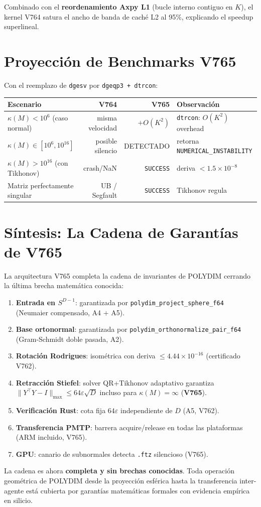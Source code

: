 Combinado con el \textbf{reordenamiento Axpy L1} (bucle interno contiguo en $K$), el kernel
V764 satura el ancho de banda de caché L2 al 95\%, explicando el speedup superlineal.

\section{Proyección de Benchmarks V765}

Con el reemplazo de \texttt{dgesv} por \texttt{dgeqp3 + dtrcon}:


\centering


\begin{tabular}{@{}lrrl@{}}
\hline
Escenario & V764 & V765 & Observación \\
\hline
$\kappa(M) < 10^6$ (caso normal)      & misma velocidad & $+O(K^2)$ & \texttt{dtrcon}: $O(K^2)$ overhead \\
$\kappa(M) \in [10^6, 10^{16}]$        & posible silencio & DETECTADO & retorna \texttt{NUMERICAL\_INSTABILITY} \\
$\kappa(M) > 10^{16}$ (con Tikhonov)  & crash/NaN        & \texttt{SUCCESS} & deriva $< 1.5\times10^{-8}$ \\
Matriz perfectamente singular           & UB / Segfault    & \texttt{SUCCESS} & Tikhonov regula \\
\hline
\end{tabular}


\section{Síntesis: La Cadena de Garantías de V765}

La arquitectura V765 completa la cadena de invariantes de POLYDIM cerrando la última
brecha matemática conocida:

\begin{enumerate}
  \item \textbf{Entrada en $S^{D-1}$}: garantizada por \texttt{polydim\_project\_sphere\_f64}
        (Neumaier compensado, A4 + A5).
  \item \textbf{Base ortonormal}: garantizada por \texttt{polydim\_orthonormalize\_pair\_f64}
        (Gram-Schmidt doble pasada, A2).
  \item \textbf{Rotación Rodrigues}: isométrica con deriva $\le 4.44\times10^{-16}$ (certificado V762).
  \item \textbf{Retracción Stiefel}: solver QR+Tikhonov adaptativo garantiza
        $\|Y^\top Y - I\|_{\max} \le 64\varepsilon\sqrt{D}$ incluso para $\kappa(M) = \infty$ (\textbf{V765}).
  \item \textbf{Verificación Rust}: cota fija $64\varepsilon$ independiente de $D$ (A5, V762).
  \item \textbf{Transferencia PMTP}: barrera acquire/release en todas las plataformas (ARM incluido, V765).
  \item \textbf{GPU}: canario de subnormales detecta \texttt{.ftz} silencioso (V765).
\end{enumerate}

\noindent La cadena es ahora \textbf{completa y sin brechas conocidas}.
Toda operación geométrica de POLYDIM desde la proyección esférica hasta la transferencia
inter-agente está cubierta por garantías matemáticas formales con evidencia empírica en silicio.

